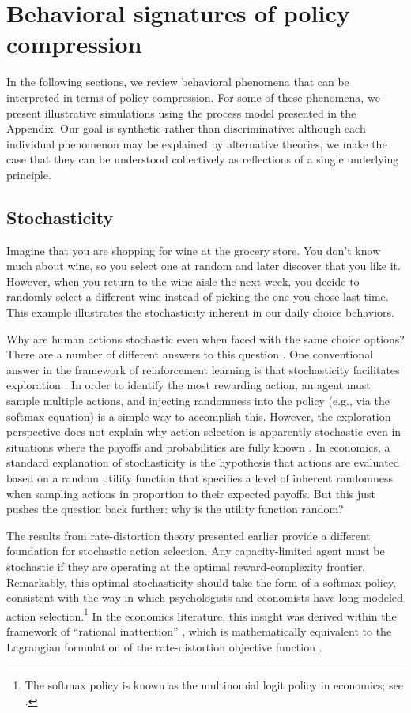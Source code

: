 \documentclass[11pt]{article}
\begin{document}
\section{Behavioral signatures of policy compression}

In the following sections, we review behavioral phenomena that can be interpreted in terms of policy compression. For some of these phenomena, we present illustrative simulations using the process model presented in the Appendix. Our goal is synthetic rather than discriminative: although each individual phenomenon may be explained by alternative theories, we make the case that they can be understood collectively as reflections of a single underlying principle.

\subsection{Stochasticity}
Imagine that you are shopping for wine at the grocery store. You don’t know much about wine, so you select one at random and later discover that you like it. However, when you return to the wine aisle the next week, you decide to randomly select a different wine instead of picking the one you chose last time. This example illustrates the stochasticity inherent in our daily choice behaviors.
 
Why are human actions stochastic even when faced with the same choice options? There are a number of different answers to this question \citep[see][]{icard19}. One conventional answer in the framework of reinforcement learning is that stochasticity facilitates exploration \citep{schulz19}. In order to identify the most rewarding action, an agent must sample multiple actions, and injecting randomness into the policy (e.g., via the softmax equation) is a simple way to accomplish this. However, the exploration perspective does not explain why action selection is apparently stochastic even in situations where the payoffs and probabilities are fully known \citep[e.g.,][]{mosteller51}. In economics, a standard explanation of stochasticity is the hypothesis that actions are evaluated based on a random utility function that specifies a level of inherent randomness when sampling actions in proportion to their expected payoffs. But this just pushes the question back further: why is the utility function random?

The results from rate-distortion theory presented earlier provide a different foundation for stochastic action selection. Any capacity-limited agent must be stochastic if they are operating at the optimal reward-complexity frontier. Remarkably, this optimal stochasticity should take the form of a softmax policy, consistent with the way in which psychologists and economists have long modeled action selection.\footnote{The softmax policy is known as the multinomial logit policy in economics; see \citet{mcfadden01}.} In the economics literature, this insight was derived within the framework of ``rational inattention'' \citep{matvejka15}, which is mathematically equivalent to the Lagrangian formulation of the rate-distortion objective function \citep[see Appendix and][]{denti19}.
\end{document}
